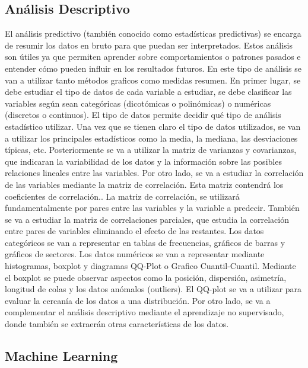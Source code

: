 \documentclass[spanish,12pt, a4paper,twoside]{paper}
\begin{document}
\subsection{Análisis Descriptivo}
\justify
El análisis predictivo (también conocido como estadísticas predictivas) se encarga de resumir los datos en bruto para que puedan ser interpretados. Estos análisis son útiles ya que permiten aprender sobre comportamientos o patrones pasados e entender cómo pueden influir en los resultados futuros. En este tipo de análisis se van a utilizar tanto métodos graficos como medidas resumen.
\justify
En primer lugar, se debe estudiar el tipo de datos de cada variable a estudiar, se debe clasificar las variables según sean categóricas (dicotómicas o polinómicas) o numéricas (discretos o continuos). El tipo de datos permite decidir qué tipo de análisis estadístico utilizar.
Una vez que se tienen claro el tipo de datos utilizados, se van a utilizar los principales estadísticos como la media, la mediana, las desviaciones típicas, etc.
Posteriormente se va a utilizar la matriz de varianzas y covarianzas, que indicaran la variabilidad de los datos y la información sobre las posibles relaciones lineales entre las variables. 
\justify
Por otro lado, se va a estudiar la correlación de las variables mediante la matriz de correlación. Esta matriz contendrá los coeficientes de correlación.\cite{JMMarin}. La matriz de correlación, se utilizará fundamentalmente por pares entre las variables y la variable a predecir.
\justify
También se va a estudiar la matriz de correlaciones parciales, que estudia la correlación entre pares de variables eliminando el efecto de las restantes.\cite{JMMarin}
\justify
Los datos categóricos se van a representar en tablas de frecuencias, gráficos de barras y gráficos de sectores. Los datos numéricos se van a representar mediante histogramas, boxplot y diagramas QQ-Plot o Grafico Cuantil-Cuantil. \cite{Orellana2001}
\justify
Mediante el boxplot se puede observar aspectos como la posición, dispersión, asimetría, longitud de colas y los datos anómalos (outliers). 
El QQ-plot se va a utilizar para evaluar la cercanía de los datos a una distribución. \cite{Orellana2001}
\justify
Por otro lado, se va a complementar el análisis descriptivo mediante el aprendizaje no supervisado, donde también se extraerán otras características de los datos.

\subsection{Machine Learning}
\end{document}
